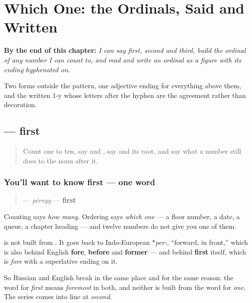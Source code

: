 
\chapter{Which One: the Ordinals, Said and Written}
\label{ch:ru-ordinals}

\begin{chapteropening}
\textbf{By the end of this chapter:} \emph{I can say first, second and third, build the ordinal of any number I can count to, and read and write an ordinal as a figure with its ending hyphenated on.}

Two forms outside the pattern, one adjective ending for everything above them, and the written 1-y whose letters after the hyphen are the agreement rather than decoration.
\end{chapteropening}

\section[\texorpdfstring{\ru{первый} (pérvyy)}{первый (pérvyy)}]{ — first}

\label{lesson:RU-C26-pervyy}



\begin{quote}
Count one to ten, say \textbf{} and \textbf{}, say \textbf{} and its root, and say what a number still does to the noun after it.
\end{quote}

\subsection*{You'll want to know first — one word}
\begin{quote}
\textbf{} — \emph{pérvyy} — \textbf{first}
\end{quote}

Counting says \emph{how many}. Ordering says \emph{which one} — a floor number, a date, a queue, a chapter heading — and twelve numbers do not give you one of them.

\begin{cousinweb}
\textbf{} is not built from \textbf{}. It goes back to Indo-European *\emph{per-}, \textquotedblleft{}forward, in front,\textquotedblright{} which is also behind English \textbf{fore}, \textbf{before} and \textbf{former} — and behind \textbf{first} itself, which is \emph{fore} with a superlative ending on it.

So Russian and English break in the same place and for the same reason: the word for \emph{first} means \emph{foremost} in both, and neither is built from the word for \emph{one}. The series comes into line at \emph{second}.
\end{cousinweb}

